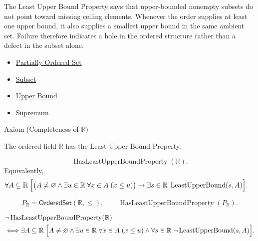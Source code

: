 \begin{remark*}[Interpretation]
The Least Upper Bound Property says that upper-bounded nonempty subsets do not point toward missing ceiling elements. Whenever the order supplies at least one upper bound, it also supplies a smallest upper bound in the same ambient set. Failure therefore indicates a hole in the ordered structure rather than a defect in the subset alone.
\end{remark*}

\begin{dependencies}
\begin{itemize}
  \item \hyperref[def:partially-ordered-set]{Partially Ordered Set}
  \item \hyperref[def:subset]{Subset}
  \item \hyperref[def:real-upper-bound]{Upper Bound}
  \item \hyperref[def:supremum]{Supremum}
\end{itemize}
\end{dependencies}






\begin{axiombox}{Axiom (Completeness of $\mathbb{R}$)}
\begin{axiom}
\label{ax:completeness-of-reals}
The ordered field $\mathbb{R}$ has the Least Upper Bound Property.
\end{axiom}
\end{axiombox}

\begin{remark*}
\[
\operatorname{HasLeastUpperBoundProperty}(\mathbb{R}).
\]
Equivalently,
\[
\begin{aligned}
&\forall A\subseteq\mathbb{R}\;
\Bigl[
\bigl(A\neq\varnothing \land \exists u\in\mathbb{R}\;\forall x\in A\;(x\le u)\bigr)
\rightarrow
\exists s\in\mathbb{R}\;\operatorname{LeastUpperBound}(s,A)
\Bigr].
\end{aligned}
\]
\end{remark*}

\begin{remark*}
\[
P_{\mathbb{R}}=\mathsf{OrderedSet}(\mathbb{R},\leq),\qquad
\operatorname{HasLeastUpperBoundProperty}(P_{\mathbb{R}}).
\]
\end{remark*}

\begin{remark*}
\[
\begin{aligned}
&\neg\operatorname{HasLeastUpperBoundProperty}(\mathbb{R})\\
&\Longleftrightarrow
\exists A\subseteq\mathbb{R}\;
\Bigl[
A\neq\varnothing
\land
\exists u\in\mathbb{R}\;\forall x\in A\;(x\le u)
\land
\forall s\in\mathbb{R}\;\neg\operatorname{LeastUpperBound}(s,A)
\Bigr].
\end{aligned}
\]
\end{remark*}

